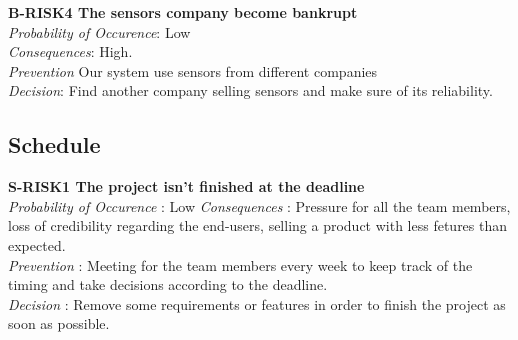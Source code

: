	\textbf{ B-RISK4 The sensors company become bankrupt} \\
	\textit{Probability of Occurence}: Low \\
	\textit{Consequences}: High.\\
	\textit{Prevention} Our system use sensors from different companies \\
	\textit{Decision}: Find another company selling sensors and make sure of its reliability. \\


\subsection{Schedule}

	\textbf{ S-RISK1 The project isn't finished at the deadline} \\
	\textit {Probability of Occurence}  : Low
	\textit{Consequences} : Pressure for all the team members, loss of credibility regarding the end-users, selling a product with less fetures than expected.\\
	\textit{Prevention} : Meeting for the team members every week to keep track of the timing and take decisions according to the deadline. \\
	\textit{Decision} : Remove some requirements or features in order to finish the project as soon as possible.\\